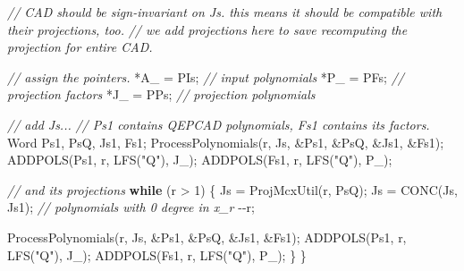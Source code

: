 \documentclass[
]{book}
\newenvironment{Shaded}{\begin{snugshade}}{\end{snugshade}}
\newcommand{\CommentTok}[1]{\textcolor[rgb]{0.56,0.35,0.01}{\textit{#1}}}
\newcommand{\ControlFlowTok}[1]{\textcolor[rgb]{0.13,0.29,0.53}{\textbf{#1}}}
\newcommand{\DecValTok}[1]{\textcolor[rgb]{0.00,0.00,0.81}{#1}}
\newcommand{\NormalTok}[1]{#1}
\newcommand{\StringTok}[1]{\textcolor[rgb]{0.31,0.60,0.02}{#1}}
\theoremstyle{definition}
\theoremstyle{definition}
\theoremstyle{definition}
\theoremstyle{definition}
\theoremstyle{remark}
\begin{document}
\begin{Shaded}
\begin{Highlighting}[numbers=left,,]
    \CommentTok{// CAD should be sign{-}invariant on Js. this means it should be compatible with their projections, too.}
    \CommentTok{// we add projections here to save recomputing the projection for entire CAD.}

    \CommentTok{// assign the pointers.}
\NormalTok{    *A\_ = PIs; }\CommentTok{// input polynomials}
\NormalTok{    *P\_ = PFs; }\CommentTok{// projection factors}
\NormalTok{    *J\_ = PPs; }\CommentTok{// projection polynomials}

    \CommentTok{// add Js...}
    \CommentTok{// Ps1 contains QEPCAD polynomials, Fs1 contains its factors.}
\NormalTok{    Word Ps1, PsQ, Js1, Fs1;}
\NormalTok{    ProcessPolynomials(r, Js, \&Ps1, \&PsQ, \&Js1, \&Fs1);}
\NormalTok{    ADDPOLS(Ps1, r, LFS(}\StringTok{"Q"}\NormalTok{), J\_);}
\NormalTok{    ADDPOLS(Fs1, r, LFS(}\StringTok{"Q"}\NormalTok{), P\_);}

    \CommentTok{// and its projections}
    \ControlFlowTok{while}\NormalTok{ (r \textgreater{} }\DecValTok{1}\NormalTok{) \{}
\NormalTok{        Js = ProjMcxUtil(r, PsQ);}
\NormalTok{        Js = CONC(Js, Js1); }\CommentTok{// polynomials with 0 degree in x\_r}
\NormalTok{        {-}{-}r;}

\NormalTok{        ProcessPolynomials(r, Js, \&Ps1, \&PsQ, \&Js1, \&Fs1);}
\NormalTok{        ADDPOLS(Ps1, r, LFS(}\StringTok{"Q"}\NormalTok{), J\_);}
\NormalTok{        ADDPOLS(Fs1, r, LFS(}\StringTok{"Q"}\NormalTok{), P\_);}
\NormalTok{    \}}
\NormalTok{\}}
\end{Highlighting}
\end{Shaded}
\end{document}
